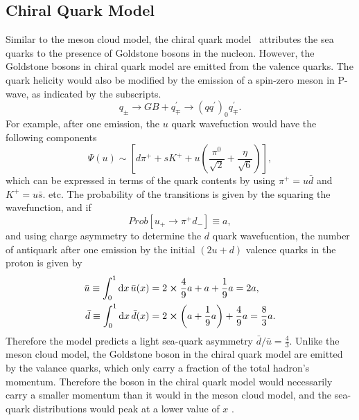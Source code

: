 \documentclass[../main.tex]{subfiles}
\begin{document}
\subsection{Chiral Quark Model}
Similar to the meson cloud model, the chiral quark model~\cite{li1998} attributes the sea quarks to
the presence of Goldstone bosons in the nucleon. However, the Goldstone bosons in chiral quark model
are emitted from the valence quarks. The quark helicity would also be modified by the emission of a
spin-zero meson in P-wave, as indicated by the subscripts.
\begin{equation}
	q_{\pm} \rightarrow GB + q^\prime_\mp \rightarrow \left(q q^\prime\right)_0 q_{\mp}^\prime.
\end{equation}
For example, after one emission, the $u$ quark wavefuction would have the following components
\begin{equation}
	\Psi\left(u\right) \sim \left[d\pi^+ + s K^+ + u \left(\frac{\pi^0}{\sqrt{2}} + \frac{\eta}{\sqrt{6}}\right)\right],
\end{equation}
which can be expressed in terms of the quark contents by using $\pi^+ = u\bar{d}$ and $K^+ = u\bar{s}$. etc.
The probability of the transitions is given by the squaring the wavefunction, and if
\begin{equation}
	Prob\left[ u_+ \rightarrow \pi^+d_-\right] \equiv a,
\end{equation}
and using charge asymmetry to determine the $d$ quark wavefucntion, the number of antiquark after one emission
by the initial $(2u+d)$ valence quarks in the proton is given by
\begin{equation}
	\begin{aligned}
		\bar{u} \equiv \int^1_0 \dd{x}\bar{u}(x) & = 2\cross\frac{4}{9}a +a+\frac{1}{9}a = 2a,                         \\
		\bar{d} \equiv \int^1_0 \dd{x}\bar{d}(x) & = 2\cross\left(a+\frac{1}{9}a\right) + \frac{4}{9}a = \frac{8}{3}a.
	\end{aligned}
\end{equation}
Therefore the model predicts a light sea-quark asymmetry $\bar{d}/\bar{u} =\frac{4}{3} $.
Unlike the meson cloud model, the Goldstone boson in the chiral quark model are emitted
by the valance quarks, which only carry a fraction of the total hadron's momentum.
Therefore the boson in the chiral quark model would necessarily carry a smaller momentum than
it would in the meson cloud model, and the sea-quark distributions would peak at a lower value of $x$ \cite{szczurek1996,peng1998}.
\end{document}
